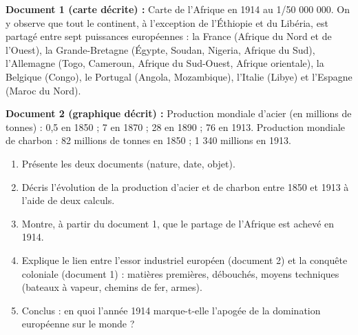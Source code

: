 \documentclass[11pt]{article}
\begin{document}
\begin{exercice}
\textbf{Document 1 (carte décrite) :} Carte de l'Afrique en 1914 au 1/50 000 000. On y observe que tout le continent, à l'exception de l'Éthiopie et du Libéria, est partagé entre sept puissances européennes : la France (Afrique du Nord et de l'Ouest), la Grande-Bretagne (Égypte, Soudan, Nigeria, Afrique du Sud), l'Allemagne (Togo, Cameroun, Afrique du Sud-Ouest, Afrique orientale), la Belgique (Congo), le Portugal (Angola, Mozambique), l'Italie (Libye) et l'Espagne (Maroc du Nord).
\par\medskip
\textbf{Document 2 (graphique décrit) :} Production mondiale d'acier (en millions de tonnes) : 0,5 en 1850 ; 7 en 1870 ; 28 en 1890 ; 76 en 1913. Production mondiale de charbon : 82 millions de tonnes en 1850 ; 1 340 millions en 1913.
\begin{enumerate}
\item Présente les deux documents (nature, date, objet).
\item Décris l'évolution de la production d'acier et de charbon entre 1850 et 1913 à l'aide de deux calculs.
\item Montre, à partir du document 1, que le partage de l'Afrique est achevé en 1914.
\item Explique le lien entre l'essor industriel européen (document 2) et la conquête coloniale (document 1) : matières premières, débouchés, moyens techniques (bateaux à vapeur, chemins de fer, armes).
\item Conclus : en quoi l'année 1914 marque-t-elle l'apogée de la domination européenne sur le monde ?
\end{enumerate}
\end{exercice}
\end{document}

